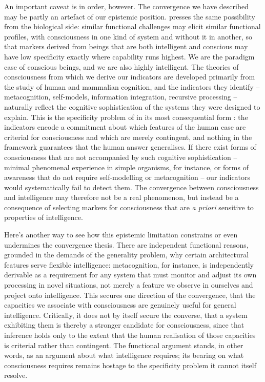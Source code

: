 \documentclass[11pt, a4paper, onecolumn, gdm]{google}
\begin{document}
An important caveat is in order, however.
The convergence we have described may be partly an artefact of our epistemic position.
\citet{seth2026guardian,seth2026stuff} presses the same possibility from the biological side: similar functional challenges may elicit similar functional profiles, with consciousness in one kind of system and without it in another, so that markers derived from beings that are both intelligent and conscious may have low specificity exactly where capability runs highest.
We are the paradigm case of conscious beings, and we are also highly intelligent.
The theories of consciousness from which we derive our indicators are developed primarily from the study of human and mammalian cognition, and the indicators they identify -- metacognition, self-models, information integration, recursive processing -- naturally reflect the cognitive sophistication of the systems they were designed to explain.
This is the specificity problem of  in its most consequential form \citep{shevlin2021}: the indicators encode a commitment about which features of the human case are criterial for consciousness and which are merely contingent, and nothing in the framework guarantees that the human answer generalises.
If there exist forms of consciousness that are not accompanied by such cognitive sophistication -- minimal phenomenal experience in simple organisms, for instance, or forms of awareness that do not require self-modelling or metacognition -- our indicators would systematically fail to detect them.
The convergence between consciousness and intelligence may therefore not be a real phenomenon, but instead be a consequence of selecting markers for consciousness that are \emph{a priori} sensitive to properties of intelligence.

Here's another way to see how this epistemic limitation constrains or even undermines the convergence thesis.
There are independent functional reasons, grounded in the demands of the generality problem, why certain architectural features serve flexible intelligence: metacognition, for instance, is independently derivable as a requirement for any system that must monitor and adjust its own processing in novel situations, not merely a feature we observe in ourselves and project onto intelligence.
This secures one direction of the convergence, that the capacities we associate with consciousness are genuinely useful for general intelligence.
Critically, it does not by itself secure the converse, that a system exhibiting them is thereby a stronger candidate for consciousness, since that inference holds only to the extent that the human realisation of those capacities is criterial rather than contingent.
The functional argument stands, in other words, as an argument about what intelligence requires; its bearing on what consciousness requires remains hostage to the specificity problem it cannot itself resolve.
\end{document}
